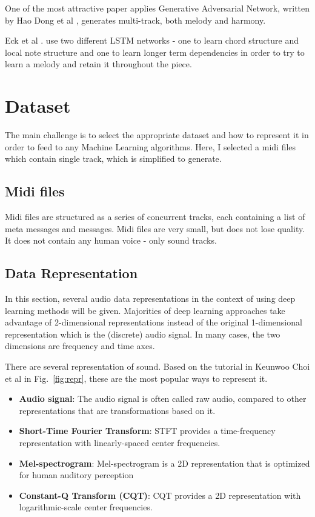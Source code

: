 \documentclass[journal, a4paper]{IEEEtran}
\begin{document}
    One of the most attractive paper applies Generative Adversarial Network, written by Hao Dong et al \cite{1}, generates multi-track, both melody and harmony.

    Eck et al \cite{6}. use two different LSTM networks - one to learn chord structure and local note structure and one to learn longer term dependencies in order to try to learn a melody and retain it throughout the piece.

\section{Dataset}
	The main challenge is to select the appropriate dataset and how to represent it in order to feed to any Machine Learning algorithms. Here, I selected a midi files which contain single track, which is simplified to generate.

\subsection{Midi files}
	Midi files are structured as a series of concurrent tracks, each containing a list of meta messages and messages. Midi files are very small, but does not lose quality. It does not contain any human voice - only sound tracks. 

\subsection{Data Representation}
	In this section, several audio data representations in the context of using deep learning methods will be given. Majorities of deep learning approaches take advantage of 2-dimensional representations instead of the original 1-dimensional representation which is the (discrete) audio signal. In many cases, the two dimensions are frequency and time axes.
    
    There are several representation of sound. Based on the tutorial in Keunwoo Choi et al \cite{2} in Fig.~\ref{fig:repr}, these are the most popular ways to represent it.
 
\begin{itemize}
\item \textbf{Audio signal}: The audio signal is often called raw audio, compared to other representations that are transformations based on it.
\item \textbf{Short-Time Fourier Transform}: STFT provides a time-frequency representation with linearly-spaced center frequencies.
\item \textbf{Mel-spectrogram}: Mel-spectrogram is a 2D representation that is optimized for human auditory perception
\item \textbf{Constant-Q Transform (CQT)}: CQT provides a 2D representation with logarithmic-scale center frequencies.
\end{itemize}
\end{document}
